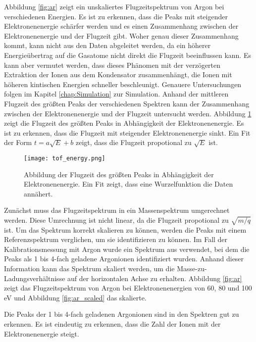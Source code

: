 Abbildung \ref{fig:ar} zeigt ein unskaliertes Flugzeitspektrum von Argon bei verschiedenen Energien. Es ist zu erkennen, dass die Peaks mit steigender Elektronenenergie schärfer werden und es einen Zusammenhang zwischen der Elektronenenergie und der Flugzeit gibt. Woher genau dieser Zusammenhang kommt, kann nicht aus den Daten abgeleitet werden, da ein höherer Energieübertrag auf die Gasatome nicht direkt die Flugzeit beeinflussen kann. Es kann aber vermutet werden, dass dieses Phänomen mit der verzögerten Extraktion der Ionen aus dem Kondensator zusammenhängt, die Ionen mit höheren kintischen Energien schneller beschleunigt. Genauere Untersuchungen folgen im Kapitel \ref{chap:Simulation} zur Simulation. Anhand der mittleren Flugzeit des größten Peaks der verschiedenen Spektren kann der Zusammenhang zwischen der Elektronenenergie und der Flugzeit untersucht werden.
Abbildung \ref{fig:tof_energy} zeigt die Flugzeit des größten Peaks in Abhängigkeit der Elektronenenergie. Es ist zu erkennen, dass die Flugzeit mit steigender Elektronenenergie sinkt. Ein Fit der Form $t = a\sqrt{E} + b$ zeigt, dass die Flugzeit propotional zu $\sqrt{E}$ ist.

\begin{figure}
    \centering
    \texttt{[image: tof\_energy.png]}
    \caption[Abbildung TOF über Elektronenenergie]{Abbildung der Flugzeit des größten Peaks in Abhängigkeit der Elektronenenergie. Ein Fit zeigt, dass eine Wurzelfunktion die Daten annähert.}
    \label{fig:tof_energy}
\end{figure}

Zunächst muss das Flugzeitspektrum in ein Massenspektrum umgerechnet werden. Diese Umrechnung ist nicht linear, da die Flugzeit propotional zu $\sqrt{m/q}$ ist. Um das Spektrum korrekt skalieren zu können, werden die Peaks mit einem Referenzspektrum verglichen, um sie identifizieren zu können. Im Fall der Kalibrationsmessung mit Argon wurde ein Spektrum aus \cite{Straub} verwendet, bei dem die Peaks als 1 bis 4-fach geladene Argonionen identifiziert wurden. Anhand dieser Information kann das Spektrum skaliert werden, um die Masse-zu-Ladungsverhältnisse auf der horizontalen Achse zu erhalten. Abbildung \ref{fig:ar} zeigt das Flugzeitspektrum von Argon bei Elektronenenergien von 60, 80 und 100 eV und Abbildung \ref{fig:ar_scaled} das skalierte. 

Die Peaks der 1 bis 4-fach geladenen Argonionen sind in den Spektren gut zu erkennen. Es ist eindeutig zu erkennen, dass die Zahl der Ionen mit der Elektronenenergie steigt.

